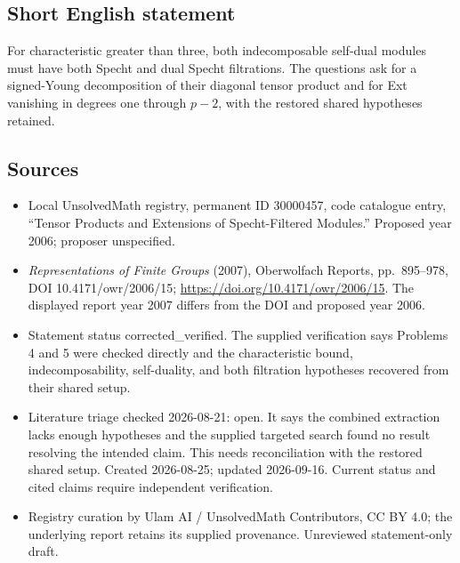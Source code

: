 \documentclass[11pt]{article}
\begin{document}
\subsection{Short English statement}
For characteristic greater than three, both indecomposable self-dual modules must have both Specht and dual Specht filtrations. The questions ask for a signed-Young decomposition of their diagonal tensor product and for Ext vanishing in degrees one through $p-2$, with the restored shared hypotheses retained.
\subsection{Sources}
\begin{itemize}
\item Local UnsolvedMath registry, permanent ID 30000457, code catalogue entry, ``Tensor Products and Extensions of Specht-Filtered Modules.'' Proposed year 2006; proposer unspecified.
\item \emph{Representations of Finite Groups} (2007), Oberwolfach Reports, pp.\ 895--978, DOI 10.4171/owr/2006/15; \url{https://doi.org/10.4171/owr/2006/15}. The displayed report year 2007 differs from the DOI and proposed year 2006.
\item Statement status corrected\_verified. The supplied verification says Problems 4 and 5 were checked directly and the characteristic bound, indecomposability, self-duality, and both filtration hypotheses recovered from their shared setup.
\item Literature triage checked 2026-08-21: open. It says the combined extraction lacks enough hypotheses and the supplied targeted search found no result resolving the intended claim. This needs reconciliation with the restored shared setup. Created 2026-08-25; updated 2026-09-16. Current status and cited claims require independent verification.
\item Registry curation by Ulam AI / UnsolvedMath Contributors, CC BY 4.0; the underlying report retains its supplied provenance. Unreviewed statement-only draft.
\end{itemize}
\end{document}
